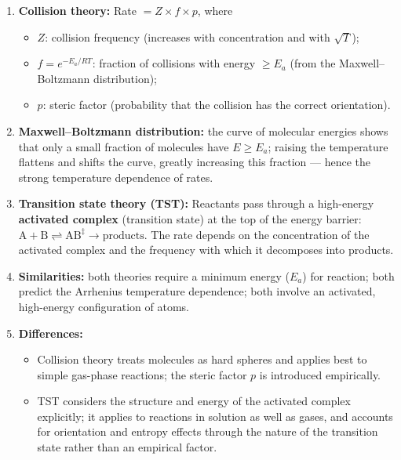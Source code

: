 \documentclass[11pt]{article}
\begin{document}
\begin{methode}
\begin{enumerate}
\item \textbf{Collision theory:} Rate $= Z \times f \times p$, where
    \begin{itemize}
    \item $Z$: collision frequency (increases with concentration and with $\sqrt{T}$);
    \item $f = e^{-E_a/RT}$: fraction of collisions with energy $\ge E_a$ (from the Maxwell--Boltzmann distribution);
    \item $p$: steric factor (probability that the collision has the correct orientation).
    \end{itemize}
\item \textbf{Maxwell--Boltzmann distribution:} the curve of molecular energies shows that only a small fraction of molecules have $E \ge E_a$; raising the temperature flattens and shifts the curve, greatly increasing this fraction — hence the strong temperature dependence of rates.
\item \textbf{Transition state theory (TST):} Reactants pass through a high-energy \textbf{activated complex} (transition state) at the top of the energy barrier: $\ensuremath{\mathrm{A + B \rightleftharpoons  AB^{\ddagger} \rightarrow  products}}$. The rate depends on the concentration of the activated complex and the frequency with which it decomposes into products.
\item \textbf{Similarities:} both theories require a minimum energy ($E_a$) for reaction; both predict the Arrhenius temperature dependence; both involve an activated, high-energy configuration of atoms.
\item \textbf{Differences:}
    \begin{itemize}
    \item Collision theory treats molecules as hard spheres and applies best to simple gas-phase reactions; the steric factor $p$ is introduced empirically.
    \item TST considers the structure and energy of the activated complex explicitly; it applies to reactions in solution as well as gases, and accounts for orientation and entropy effects through the nature of the transition state rather than an empirical factor.
    \end{itemize}
\end{enumerate}
\end{methode}
\end{document}
